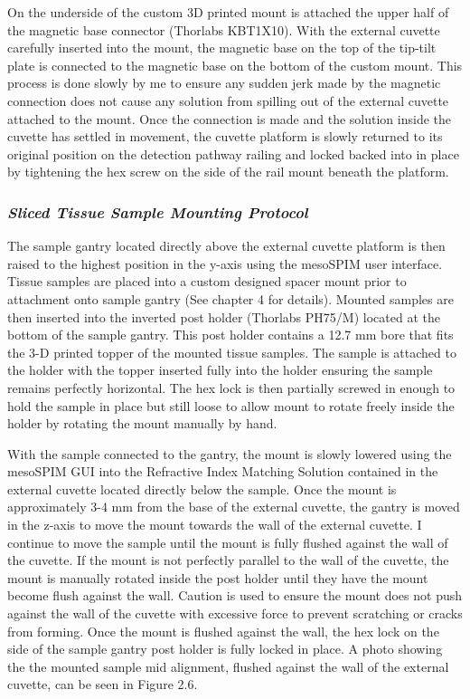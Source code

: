 On the underside of the custom 3D printed mount is attached the upper half of the magnetic base connector (Thorlabs KBT1X10). With the external cuvette carefully inserted into the mount, the magnetic base on the top of the tip-tilt plate is connected to the magnetic base on the bottom of the custom mount. This process is done slowly by me to ensure any sudden jerk made by the magnetic connection does not cause any solution from spilling out of the external cuvette attached to the mount. Once the connection is made and the solution inside the cuvette has settled in movement, the cuvette platform is slowly returned to its original position on the detection pathway railing and locked backed into in place by tightening the hex screw on the side of the rail mount beneath the platform. 

\subsubsection{\textit{Sliced Tissue Sample Mounting Protocol}}
The sample gantry located directly above the external cuvette platform is then raised to the highest position in the y-axis using the mesoSPIM user interface. Tissue samples are placed into a custom designed spacer mount prior to attachment onto sample gantry (See chapter 4 for details). Mounted samples are then inserted into the inverted post holder (Thorlabs PH75/M) located at the bottom of the sample gantry. This post holder contains a 12.7 mm bore that fits the 3-D printed topper of the mounted tissue samples.  The sample is attached to the holder with the topper inserted fully into the holder ensuring the sample remains perfectly horizontal. The hex lock is then partially screwed in enough to hold the sample in place but still loose to allow mount to rotate freely inside the holder by rotating the mount manually by hand.

With the sample connected to the gantry, the mount is slowly lowered using the mesoSPIM GUI into the Refractive Index Matching Solution contained in the external cuvette located directly below the sample. Once the mount is approximately 3-4 mm from the base of the external cuvette, the gantry is moved in the z-axis to move the mount towards the wall of the external cuvette. I continue to move the sample until the mount is fully flushed against the wall of the cuvette. If the mount is not perfectly parallel to the wall of the cuvette, the mount is manually rotated inside the post holder until they have the mount become flush against the wall. Caution is used to ensure the mount does not push against the wall of the cuvette with excessive force to prevent scratching or cracks from forming. Once the mount is flushed against the wall, the hex lock on the side of the sample gantry post holder is fully locked in place. A photo showing the the mounted sample mid alignment, flushed against the wall of the external cuvette, can be seen in Figure 2.6.

